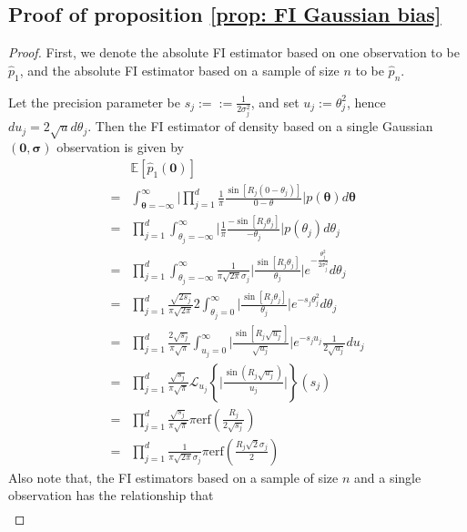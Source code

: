 \documentclass[%
 reprint,
 amsmath,amssymb,
 aps,
]{revtex4-2}
\def\E{\mathbb{E}}
\def\erf{\text{erf}}
\def\btheta{\boldsymbol{\theta}}
\def\btheta{\boldsymbol{\theta}}
\newcommand{\btheta}{\mbox{\boldmath $\theta$}}
\begin{document}
\subsection{Proof of proposition \ref{prop: FI Gaussian bias}}
\begin{proof}
    First, we denote the absolute FI estimator based on one observation to be $\hat{p}_{\text{1}}$, and the absolute FI estimator based on a sample of size $n$ to be $\hat{p}_{n}$.

    Let the precision parameter be $s_j := := \frac{1}{2\sigma_j^2}$, and set $u_j := \theta_j^2$, hence $du_j = 2\sqrt{u}d\theta_j$. Then the FI estimator of density based on a single Gaussian$(\mathbf{0},
    \boldsymbol{\sigma})$ observation is given by
    \begin{align*}
        & \E[\hat{p}_{\text{1}}(\mathbf{0})] \\
        = & \int_{\btheta = -\boldsymbol{\infty}}^{\boldsymbol{\infty}}\bigg|\prod_{j = 1}^d \frac{1}{\pi} \frac{\sin[R_j(0 - \theta_j)]}{0 - \theta}\bigg| p(\btheta)d\btheta \\
        = & \prod_{j = 1}^d \int_{\theta_j = -\infty}^\infty\bigg|\frac{1}{\pi} \frac{-\sin[R_j\theta_j]}{ - \theta_j}\bigg| p(\theta_j) d\theta_j \\
        = & \prod_{j = 1}^d \int_{\theta_j = -\infty}^\infty\frac{1}{\pi\sqrt{2\pi}\sigma_j}\bigg| \frac{\sin[R_j\theta_j]}{\theta_j}\bigg| e^{-\frac{\theta_j^2}{2\sigma_j^2}} d\theta_j \\
        = & \prod_{j = 1}^d \frac{\sqrt{2s_j}}{\pi\sqrt{2\pi}}2\int_{\theta_j = 0}^\infty \bigg| \frac{\sin[R_j\theta_j]}{\theta_j}\bigg| e^{-s_j\theta_j^2} d\theta_j \\
        = & \prod_{j = 1}^d \frac{2\sqrt{s_j}}{\pi\sqrt{\pi}}\int_{u_j = 0}^\infty \bigg| \frac{\sin[R_j\sqrt{u_j}]}{\sqrt{u_j}}\bigg| e^{-s_ju_j} \frac{1}{2\sqrt{u_j}}du_j \\
        = & \prod_{j = 1}^d \frac{\sqrt{s_j}}{\pi\sqrt{\pi}} \mathcal{L}_{u_j}\left\{\bigg|\frac{\sin(R_j\sqrt{u_j})}{u_j} \bigg| \right\}(s_j) \\
        = & \prod_{j = 1}^d \frac{\sqrt{s_j}}{\pi\sqrt{\pi}} \pi \erf\left(\frac{R_j}{2\sqrt{s_j}} \right) \\
        = & \prod_{j = 1}^d \frac{1}{\pi\sqrt{2\pi}\sigma_j} \pi \erf\left(\frac{R_j\sqrt{2}\sigma_j}{2} \right)
    \end{align*}
    Also note that, the FI estimators based on a sample of size $n$ and a single observation has the relationship that
    \begin{align*}

\end{align*}
\end{proof}
\end{document}
